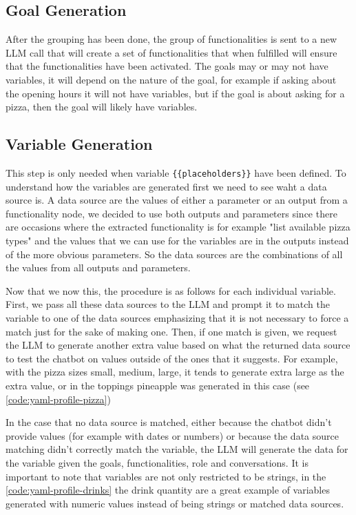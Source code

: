 \subsection{Goal Generation}

After the grouping has been done,
the group of functionalities is sent to a new \ac{LLM} call
that will create a set of functionalities that when fulfilled
will ensure that the functionalities have been activated.
The goals may or may not have variables,
it will depend on the nature of the goal,
for example if asking about the opening hours it will not have variables,
but if the goal is about asking for a pizza,
then the goal will likely have variables.

\subsection{Variable Generation}

This step is only needed when variable \texttt{\{\{placeholders\}\}} have been defined.
To understand how the variables are generated first we need to see waht a data source is.
A data source are the values of either a parameter or an output from a functionality node,
we decided to use both outputs and parameters since there are occasions
where the extracted functionality is for example "list available pizza types"
and the values that we can use for the variables
are in the outputs instead of the more obvious parameters.
So the data sources are the combinations of all the values
from all outputs and parameters.

Now that we now this, the procedure is as follows for each individual variable.
First, we pass all these data sources to the \ac{LLM}
and prompt it to match the variable to one of the data sources
emphasizing that it is not necessary to force a match
just for the sake of making one.
Then, if one match is given,
we request the \ac{LLM} to generate another extra value
based on what the returned data source
to test the chatbot on values outside of the ones that it suggests.
For example, with the pizza sizes small, medium, large,
it tends to generate extra large as the extra value,
or in the toppings pineapple was generated in this case (see \autoref{code:yaml-profile-pizza})

In the case that no data source is matched,
either because the chatbot didn't provide values
(for example with dates or numbers)
or because the data source matching didn't correctly match the variable,
the \ac{LLM} will generate the data for the variable given
the goals, functionalities, role and conversations.
It is important to note that variables are not only restricted to be strings,
in the \autoref{code:yaml-profile-drinks} the drink quantity
are a great example of variables generated
with numeric values instead of being strings or matched data sources.

